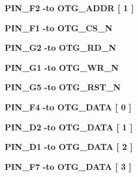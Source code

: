 \begin{DoxyCompactItemize}
\item 
{\bf P\+I\+N\+\_\+\+F2} {\bfseries \textcolor{vhdlchar}{-\/}\textcolor{keywordflow}{to}\textcolor{vhdlchar}{ }\textcolor{vhdlchar}{O\+T\+G\+\_\+\+A\+D\+DR}\textcolor{vhdlchar}{ }\textcolor{vhdlchar}{[}\textcolor{vhdlchar}{ } \textcolor{vhdldigit}{1} \textcolor{vhdlchar}{ }\textcolor{vhdlchar}{]}\textcolor{vhdlchar}{ }} 
\item 
{\bf P\+I\+N\+\_\+\+F1} {\bfseries \textcolor{vhdlchar}{-\/}\textcolor{keywordflow}{to}\textcolor{vhdlchar}{ }\textcolor{vhdlchar}{O\+T\+G\+\_\+\+C\+S\+\_\+N}\textcolor{vhdlchar}{ }} 
\item 
{\bf P\+I\+N\+\_\+\+G2} {\bfseries \textcolor{vhdlchar}{-\/}\textcolor{keywordflow}{to}\textcolor{vhdlchar}{ }\textcolor{vhdlchar}{O\+T\+G\+\_\+\+R\+D\+\_\+N}\textcolor{vhdlchar}{ }} 
\item 
{\bf P\+I\+N\+\_\+\+G1} {\bfseries \textcolor{vhdlchar}{-\/}\textcolor{keywordflow}{to}\textcolor{vhdlchar}{ }\textcolor{vhdlchar}{O\+T\+G\+\_\+\+W\+R\+\_\+N}\textcolor{vhdlchar}{ }} 
\item 
{\bf P\+I\+N\+\_\+\+G5} {\bfseries \textcolor{vhdlchar}{-\/}\textcolor{keywordflow}{to}\textcolor{vhdlchar}{ }\textcolor{vhdlchar}{O\+T\+G\+\_\+\+R\+S\+T\+\_\+N}\textcolor{vhdlchar}{ }} 
\item 
{\bf P\+I\+N\+\_\+\+F4} {\bfseries \textcolor{vhdlchar}{-\/}\textcolor{keywordflow}{to}\textcolor{vhdlchar}{ }\textcolor{vhdlchar}{O\+T\+G\+\_\+\+D\+A\+TA}\textcolor{vhdlchar}{ }\textcolor{vhdlchar}{[}\textcolor{vhdlchar}{ } \textcolor{vhdldigit}{0} \textcolor{vhdlchar}{ }\textcolor{vhdlchar}{]}\textcolor{vhdlchar}{ }} 
\item 
{\bf P\+I\+N\+\_\+\+D2} {\bfseries \textcolor{vhdlchar}{-\/}\textcolor{keywordflow}{to}\textcolor{vhdlchar}{ }\textcolor{vhdlchar}{O\+T\+G\+\_\+\+D\+A\+TA}\textcolor{vhdlchar}{ }\textcolor{vhdlchar}{[}\textcolor{vhdlchar}{ } \textcolor{vhdldigit}{1} \textcolor{vhdlchar}{ }\textcolor{vhdlchar}{]}\textcolor{vhdlchar}{ }} 
\item 
{\bf P\+I\+N\+\_\+\+D1} {\bfseries \textcolor{vhdlchar}{-\/}\textcolor{keywordflow}{to}\textcolor{vhdlchar}{ }\textcolor{vhdlchar}{O\+T\+G\+\_\+\+D\+A\+TA}\textcolor{vhdlchar}{ }\textcolor{vhdlchar}{[}\textcolor{vhdlchar}{ } \textcolor{vhdldigit}{2} \textcolor{vhdlchar}{ }\textcolor{vhdlchar}{]}\textcolor{vhdlchar}{ }} 
\item 
{\bf P\+I\+N\+\_\+\+F7} {\bfseries \textcolor{vhdlchar}{-\/}\textcolor{keywordflow}{to}\textcolor{vhdlchar}{ }\textcolor{vhdlchar}{O\+T\+G\+\_\+\+D\+A\+TA}\textcolor{vhdlchar}{ }\textcolor{vhdlchar}{[}\textcolor{vhdlchar}{ } \textcolor{vhdldigit}{3} \textcolor{vhdlchar}{ }\textcolor{vhdlchar}{]}\textcolor{vhdlchar}{ }} 

\end{DoxyCompactItemize}
